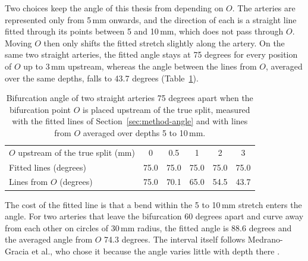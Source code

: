 Two choices keep the angle of this thesis from depending on $O$.
The arteries are represented only from 5\,mm onwards, and the direction of each is a straight line fitted through its points between 5 and 10\,mm, which does not pass through $O$.
Moving $O$ then only shifts the fitted stretch slightly along the artery.
On the same two straight arteries, the fitted angle stays at 75 degrees for every position of $O$ up to 3\,mm upstream, whereas the angle between the lines from $O$, averaged over the same depths, falls to 43.7 degrees (Table~\ref{tab:app-angle-offset}).

\begin{table}[htbp]
  \centering
  \caption{Bifurcation angle of two straight arteries 75 degrees apart when the bifurcation point $O$ is placed upstream of the true split, measured with the fitted lines of Section~\ref{sec:method-angle} and with lines from $O$ averaged over depths 5 to 10\,mm.}
  \label{tab:app-angle-offset}
  \begin{tabular}{lccccc}
    \hline
    $O$ upstream of the true split (mm) & 0 & 0.5 & 1 & 2 & 3 \\
    Fitted lines (degrees) & 75.0 & 75.0 & 75.0 & 75.0 & 75.0 \\
    Lines from $O$ (degrees) & 75.0 & 70.1 & 65.0 & 54.5 & 43.7 \\
    \hline
  \end{tabular}
\end{table}

The cost of the fitted line is that a bend within the 5 to 10\,mm stretch enters the angle.
For two arteries that leave the bifurcation 60 degrees apart and curve away from each other on circles of 30\,mm radius, the fitted angle is 88.6 degrees and the averaged angle from $O$ 74.3 degrees.
The interval itself follows Medrano-Gracia et al., who chose it because the angle varies little with depth there \cite{medranogracia2016atlas}.
